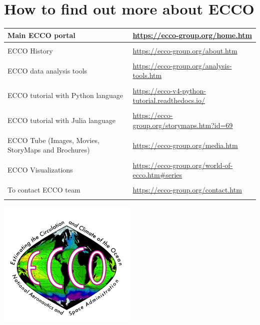 \pagebreak 
\section{How to find out more about ECCO}
\centering
\newp



\color{MidnightBlue}{A complete description of ECCO V4r4 together with all project documentation can be found at the
following web spaces:}
\par
\begin{longtable}{p{} p{}}

Main ECCO portal & \url{https://ecco-group.org/home.htm} \\ \hline \\
ECCO History & \url{https://ecco-group.org/about.htm} \\ \hline \\
ECCO data analysis tools & \url{https://ecco-group.org/analysis-tools.htm} \\ \hline \\
ECCO tutorial with Python language & \url{https://ecco-v4-python-tutorial.readthedocs.io/} \\ \hline \\
ECCO tutorial with Julia language & \url{https://ecco-group.org/storymaps.htm?id=69} \\ \hline \\
ECCO Tube (Images, Movies, StoryMaps and Brochures) & \url{https://ecco-group.org/media.htm} \\ \hline \\
ECCO Visualizations & \url{https://ecco-group.org/world-of-ecco.htm#series} \\ \hline \\
To contact ECCO team & \url{https://ecco-group.org/contact.htm}\\ \hline \\
\end{longtable}
\vspace{2.5cm}
\includegraphics[width=0.5\textwidth]{../images/ecco_logo_800_726.png}

